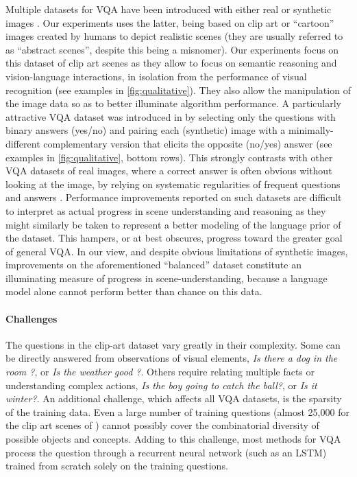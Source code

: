 Multiple datasets for VQA have been introduced with either real \cite{antol2015vqa,krishnavisualgenome,malinowski2014multi,ren2015image,zhu2015visual7w} or synthetic images \cite{antol2015vqa,zhang2015balanced}. Our experiments uses the latter, being based on clip art or ``cartoon'' images created by humans to depict realistic scenes (they are usually referred to as ``abstract scenes'', despite this being a misnomer). Our experiments focus on this dataset of clip art scenes as they allow to focus on semantic reasoning and vision-language interactions, in isolation from the performance of visual recognition (see examples in \fig\ref{fig:qualitative}). 
They also allow the manipulation of the image data so as to better illuminate algorithm performance. A particularly attractive VQA dataset was introduced in \cite{zhang2015balanced} by selecting only the questions with binary answers (\eg yes/no) and pairing each (synthetic) image with a minimally-different complementary version that elicits the opposite (no/yes) answer (see examples in \fig\ref{fig:qualitative}, bottom rows). This strongly contrasts with other VQA datasets of real images, where a correct answer is often obvious without looking at the image, by relying on systematic regularities of frequent questions and answers \cite{antol2015vqa,zhang2015balanced}. 
Performance improvements reported on such datasets are difficult to interpret as actual progress in scene understanding and reasoning as they might similarly be taken to represent a better modeling of the language prior of the dataset.
This hampers, or at best obscures, progress toward the greater goal of general VQA. In our view, and despite obvious limitations of synthetic images, improvements on the aforementioned ``balanced'' dataset constitute an illuminating measure of progress in scene-understanding, because a language model alone cannot perform better than chance on this data.

\paragraph{Challenges}
The questions in the clip-art dataset vary greatly in their complexity. Some can be directly answered from observations of visual elements, \eg \textit{Is there a dog in the room ?}, or \textit{Is the weather good ?}. Others require relating multiple facts or understanding complex actions, \eg \textit{Is the boy going to catch the ball?}, or \textit{Is it winter?}. An additional challenge, which affects all VQA datasets, is the sparsity of the training data. Even a large number of training questions (almost 25,000 for the clip art scenes of \cite{antol2015vqa}) cannot possibly cover the combinatorial diversity of possible objects and concepts. Adding to this challenge, most methods for VQA process the question through a recurrent neural network (such as an LSTM) trained from scratch solely on the training questions.

